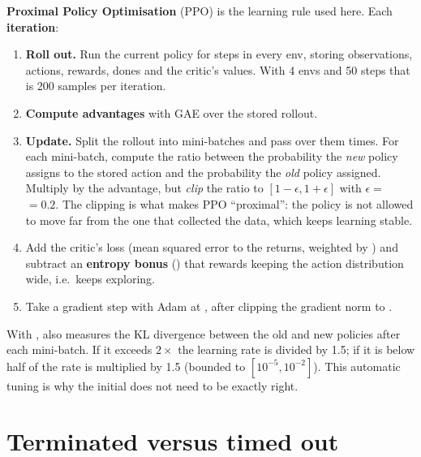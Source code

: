 \textbf{Proximal Policy Optimisation} (PPO) is the learning rule used here.
Each \textbf{iteration}:

\begin{enumerate}[leftmargin=1.8em]
  \item \textbf{Roll out.} Run the current policy for
         steps in every env, storing observations,
        actions, rewards, dones and the critic's values. With 4 envs and 50
        steps that is 200 samples per iteration.
  \item \textbf{Compute advantages} with GAE over the stored rollout.
  \item \textbf{Update.} Split the rollout into 
        mini-batches and pass over them  times.
        For each mini-batch, compute the ratio between the probability the
        \emph{new} policy assigns to the stored action and the probability the
        \emph{old} policy assigned. Multiply by the advantage, but
        \emph{clip} the ratio to $[1-\epsilon, 1+\epsilon]$ with
        $\epsilon=$  $=0.2$. The clipping is what makes PPO
        ``proximal'': the policy is not allowed to move far from the one that
        collected the data, which keeps learning stable.
  \item Add the critic's loss (mean squared error to the returns, weighted by
        ) and subtract an \textbf{entropy bonus}
        () that rewards keeping the action distribution
        wide, i.e.\ keeps exploring.
  \item Take a gradient step with Adam at , after clipping
        the gradient norm to .
\end{enumerate}

With ,  also measures the KL
divergence between the old and new policies after each mini-batch. If it
exceeds $2\times$ the learning rate is divided by 1.5; if it is
below half of  the rate is multiplied by 1.5 (bounded to
$[10^{-5}, 10^{-2}]$). This automatic tuning is why the initial
 does not need to be exactly right.

\section{Terminated versus timed out}
\label{sec:term_vs_timeout}

